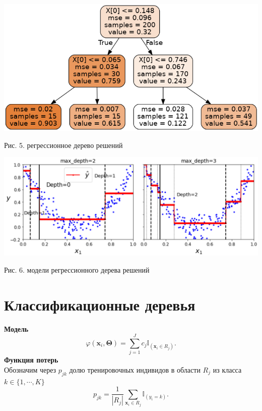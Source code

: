 \documentclass{article}
\begin{document}
\newpage

\begin{center}
	\includegraphics[scale=0.4]{pic101}
\end{center}
\begin{center}
	Рис. 5. регрессионное дерево решений
\end{center}
\begin{center}
	\includegraphics[scale=0.5]{pic102}
\end{center}
\begin{center}
	Рис. 6. модели регрессионного дерева решений
\end{center}


\newpage

\section{Классификационные деревья}
\noindent \textbf{Модель}\\
\begin{equation}
	\varphi(\textbf{x}_i, \bm{\Theta}) = \sum\limits_{j=1}^{J} c_j \mathbb{I}_{(\textbf{x}_i \in R_j)}.
\end{equation}
\noindent\textbf{Функция потерь}\\

\noindent Обозначим через ${p}_{jk}$ долю тренировочных индивидов в области $R_j$ из класса $k \in \{ 1, \cdots, K \}$
\begin{equation}
	{p}_{jk} = \dfrac{1}{|R_j|} \sum\limits_{\textbf{x}_i \in R_j} \mathbb{I}_{(y_i = k)}.
\end{equation}
\end{document}
